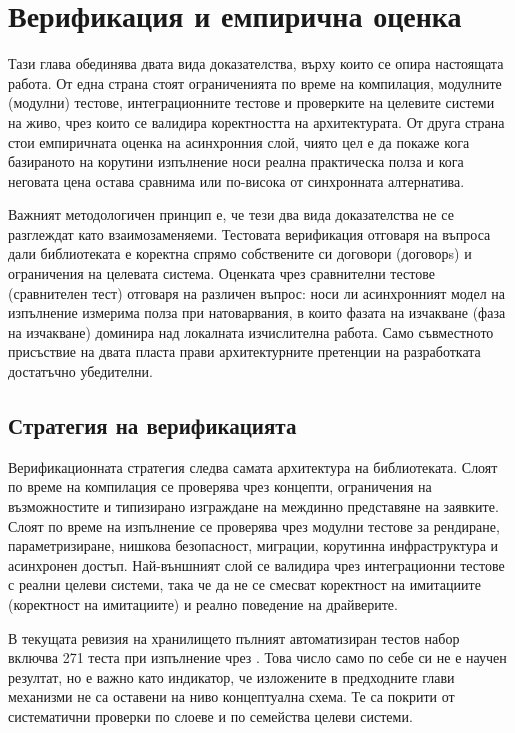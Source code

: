 \section{Верификация и емпирична оценка}
\label{sec:verification_evaluation}

Тази глава обединява двата вида доказателства, върху които се опира настоящата работа. От една страна стоят ограниченията по време на компилация, модулните (модулни) тестове, интеграционните тестове и проверките на целевите системи на живо, чрез които се валидира коректността на архитектурата. От друга страна стои емпиричната оценка на асинхронния слой, чиято цел е да покаже кога базираното на корутини изпълнение носи реална практическа полза и кога неговата цена остава сравнима или по-висока от синхронната алтернатива.

Важният методологичен принцип е, че тези два вида доказателства не се разглеждат като взаимозаменяеми. Тестовата верификация отговаря на въпроса дали библиотеката е коректна спрямо собствените си договори (договорs) и ограничения на целевата система. Оценката чрез сравнителни тестове (сравнителен тест) отговаря на различен въпрос: носи ли асинхронният модел на изпълнение измерима полза при натоварвания, в които фазата на изчакване (фаза на изчакване) доминира над локалната изчислителна работа. Само съвместното присъствие на двата пласта прави архитектурните претенции на разработката достатъчно убедителни.

\subsection{Стратегия на верификацията}

Верификационната стратегия следва самата архитектура на библиотеката. Слоят по време на компилация се проверява чрез концепти, ограничения на възможностите и типизирано изграждане на междинно представяне на заявките. Слоят по време на изпълнение се проверява чрез модулни тестове за рендиране, параметризиране, нишкова безопасност, миграции, корутинна инфраструктура и асинхронен достъп. Най-външният слой се валидира чрез интеграционни тестове с реални целеви системи, така че да не се смесват коректност на имитациите (коректност на имитациите) и реално поведение на драйверите.

В текущата ревизия на хранилището пълният автоматизиран тестов набор включва 271 теста при изпълнение чрез . Това число само по себе си не е научен резултат, но е важно като индикатор, че изложените в предходните глави механизми не са оставени на ниво концептуална схема. Те са покрити от систематични проверки по слоеве и по семейства целеви системи.

